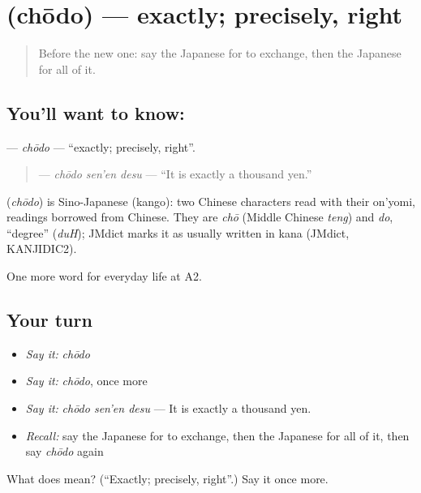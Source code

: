 \section[\texorpdfstring{\ja{ちょうど} (chōdo)}{ちょうど (chōdo)}]{ (chōdo) — exactly; precisely, right}

\label{lesson:JA-C184-choudo}



\begin{quote}
Before the new one: say the Japanese for to exchange, then the Japanese for all of it.
\end{quote}

\subsection*{You'll want to know: }
\textbf{} — \emph{chōdo} — \textquotedblleft{}exactly; precisely, right\textquotedblright{}.

\begin{quote}
\textbf{ } — \emph{chōdo sen'en desu} — \textquotedblleft{}It is exactly a thousand yen.\textquotedblright{}
\end{quote}

\begin{cousinweb}
\textbf{} (\emph{chōdo}) is Sino-Japanese (kango): two Chinese characters read with their on'yomi, readings borrowed from Chinese. They are \emph{chō} (Middle Chinese \emph{teng}) and \emph{do}, \textquotedblleft{}degree\textquotedblright{} (\emph{duH}); JMdict marks it as usually written in kana (JMdict, KANJIDIC2).
\end{cousinweb}

\begin{grammarlens}[title={What you've built}]
One more word for everyday life at A2.
\end{grammarlens}

\subsection*{Your turn}
\begin{itemize}
\raggedright
  \item \emph{Say it:} \emph{chōdo}
  \item \emph{Say it:} \emph{chōdo}, once more
  \item \emph{Say it:} \emph{chōdo sen'en desu} — It is exactly a thousand yen.
  \item \emph{Recall:} say the Japanese for to exchange, then the Japanese for all of it, then say \emph{chōdo} again
\end{itemize}

\begin{tcolorbox}[breakable,colback=teal!4,colframe=teal!35!black,title={Before you move on}]
What does  mean? (\textquotedblleft{}Exactly; precisely, right\textquotedblright{}.) Say it once more.
\end{tcolorbox}
